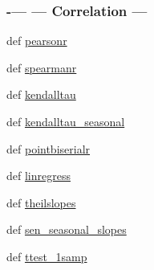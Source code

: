 \begin{DoxyCompactItemize}
\begin{DoxyCompactList}
 \subsubsection*{-\/--- --- Correlation --- }\end{DoxyCompactList}\item 
def \hyperlink{namespacescipy_1_1stats_1_1mstats__basic_acbc0606af547c9a9044b26b59e5bc3e6}{pearsonr}
\item 
def \hyperlink{namespacescipy_1_1stats_1_1mstats__basic_a2fa7863eb4669a00a49ba68a8c5cd1ae}{spearmanr}
\item 
def \hyperlink{namespacescipy_1_1stats_1_1mstats__basic_aa7b9d60b17ec5d0625c1f6657ef59911}{kendalltau}
\item 
def \hyperlink{namespacescipy_1_1stats_1_1mstats__basic_aa8e0364c94ac8c79005db32596b688c2}{kendalltau\+\_\+seasonal}
\item 
def \hyperlink{namespacescipy_1_1stats_1_1mstats__basic_a04393e40a1302a0a9d4b354990898035}{pointbiserialr}
\item 
def \hyperlink{namespacescipy_1_1stats_1_1mstats__basic_aea349a8ec6292601e8be76cae1ab40fe}{linregress}
\item 
def \hyperlink{namespacescipy_1_1stats_1_1mstats__basic_a5a7e85325e194623c2e84b1dc7a89fc6}{theilslopes}
\item 
def \hyperlink{namespacescipy_1_1stats_1_1mstats__basic_a4fd7d604b7732763c24ca9273342aefb}{sen\+\_\+seasonal\+\_\+slopes}
\item 
def \hyperlink{namespacescipy_1_1stats_1_1mstats__basic_a694110a4f8010c5fa5e00ab5e67862ee}{ttest\+\_\+1samp}
\begin{DoxyCompactList}\small\item\em 


\end{DoxyCompactList}
\end{DoxyCompactItemize}
